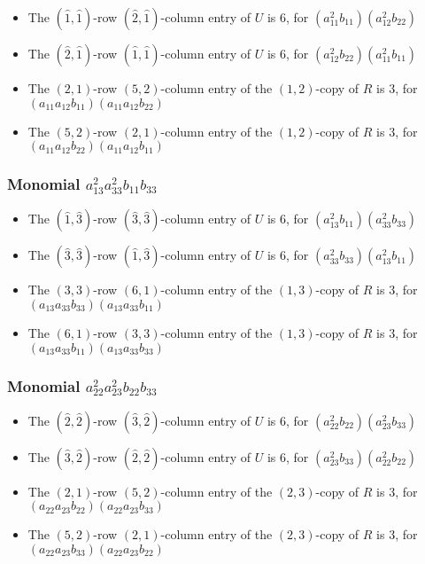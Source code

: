 \documentclass{article}
\begin{document}
\begin{itemize}
\item The $(\hat{1}, \hat{1})$-row $(\hat{2}, \hat{1})$-column entry of $U$ is $6$, for $( a_{11}^{2} b_{11} )( a_{12}^{2} b_{22} )$ 
\item The $(\hat{2}, \hat{1})$-row $(\hat{1}, \hat{1})$-column entry of $U$ is $6$, for $( a_{12}^{2} b_{22} )( a_{11}^{2} b_{11} )$ 
\item The $(2, 1)$-row $(5, 2)$-column entry of the $ \left(1, 2\right) $-copy of $R$ is $ 3 $, for $( a_{11} a_{12} b_{11} )( a_{11} a_{12} b_{22} )$ 
\item The $(5, 2)$-row $(2, 1)$-column entry of the $ \left(1, 2\right) $-copy of $R$ is $ 3 $, for $( a_{11} a_{12} b_{22} )( a_{11} a_{12} b_{11} )$ 
\end{itemize}
\subsubsection{Monomial $ a_{13}^{2} a_{33}^{2} b_{11} b_{33} $}

\begin{itemize}
\item The $(\hat{1}, \hat{3})$-row $(\hat{3}, \hat{3})$-column entry of $U$ is $6$, for $( a_{13}^{2} b_{11} )( a_{33}^{2} b_{33} )$ 
\item The $(\hat{3}, \hat{3})$-row $(\hat{1}, \hat{3})$-column entry of $U$ is $6$, for $( a_{33}^{2} b_{33} )( a_{13}^{2} b_{11} )$ 
\item The $(3, 3)$-row $(6, 1)$-column entry of the $ \left(1, 3\right) $-copy of $R$ is $ 3 $, for $( a_{13} a_{33} b_{33} )( a_{13} a_{33} b_{11} )$ 
\item The $(6, 1)$-row $(3, 3)$-column entry of the $ \left(1, 3\right) $-copy of $R$ is $ 3 $, for $( a_{13} a_{33} b_{11} )( a_{13} a_{33} b_{33} )$ 
\end{itemize}
\subsubsection{Monomial $ a_{22}^{2} a_{23}^{2} b_{22} b_{33} $}

\begin{itemize}
\item The $(\hat{2}, \hat{2})$-row $(\hat{3}, \hat{2})$-column entry of $U$ is $6$, for $( a_{22}^{2} b_{22} )( a_{23}^{2} b_{33} )$ 
\item The $(\hat{3}, \hat{2})$-row $(\hat{2}, \hat{2})$-column entry of $U$ is $6$, for $( a_{23}^{2} b_{33} )( a_{22}^{2} b_{22} )$ 
\item The $(2, 1)$-row $(5, 2)$-column entry of the $ \left(2, 3\right) $-copy of $R$ is $ 3 $, for $( a_{22} a_{23} b_{22} )( a_{22} a_{23} b_{33} )$ 
\item The $(5, 2)$-row $(2, 1)$-column entry of the $ \left(2, 3\right) $-copy of $R$ is $ 3 $, for $( a_{22} a_{23} b_{33} )( a_{22} a_{23} b_{22} )$ 
\end{itemize}
\end{document}
